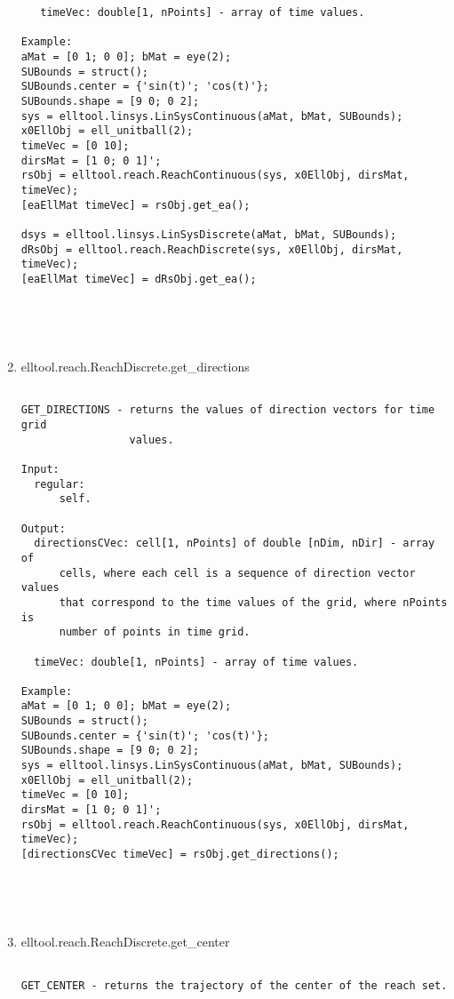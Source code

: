 \begin{enumerate}
\begin{lstlisting}
   timeVec: double[1, nPoints] - array of time values.

Example:
aMat = [0 1; 0 0]; bMat = eye(2);
SUBounds = struct();
SUBounds.center = {'sin(t)'; 'cos(t)'};
SUBounds.shape = [9 0; 0 2];
sys = elltool.linsys.LinSysContinuous(aMat, bMat, SUBounds);
x0EllObj = ell_unitball(2);
timeVec = [0 10];
dirsMat = [1 0; 0 1]';
rsObj = elltool.reach.ReachContinuous(sys, x0EllObj, dirsMat, timeVec);
[eaEllMat timeVec] = rsObj.get_ea();

dsys = elltool.linsys.LinSysDiscrete(aMat, bMat, SUBounds);
dRsObj = elltool.reach.ReachDiscrete(sys, x0EllObj, dirsMat, timeVec);
[eaEllMat timeVec] = dRsObj.get_ea();





\end{lstlisting}
\fontfamily{\familydefault}
\selectfont
\item {elltool.reach.ReachDiscrete.get\_directions}
\selectfont
\begin{lstlisting}

GET_DIRECTIONS - returns the values of direction vectors for time grid
                 values.

Input:
  regular:
      self.

Output:
  directionsCVec: cell[1, nPoints] of double [nDim, nDir] - array of
      cells, where each cell is a sequence of direction vector values
      that correspond to the time values of the grid, where nPoints is
      number of points in time grid.

  timeVec: double[1, nPoints] - array of time values.

Example:
aMat = [0 1; 0 0]; bMat = eye(2);
SUBounds = struct();
SUBounds.center = {'sin(t)'; 'cos(t)'};
SUBounds.shape = [9 0; 0 2];
sys = elltool.linsys.LinSysContinuous(aMat, bMat, SUBounds);
x0EllObj = ell_unitball(2);
timeVec = [0 10];
dirsMat = [1 0; 0 1]';
rsObj = elltool.reach.ReachContinuous(sys, x0EllObj, dirsMat, timeVec);
[directionsCVec timeVec] = rsObj.get_directions();





\end{lstlisting}
\fontfamily{\familydefault}
\selectfont
\item {elltool.reach.ReachDiscrete.get\_center}
\selectfont
\begin{lstlisting}

GET_CENTER - returns the trajectory of the center of the reach set.


\end{lstlisting}
\end{enumerate}
